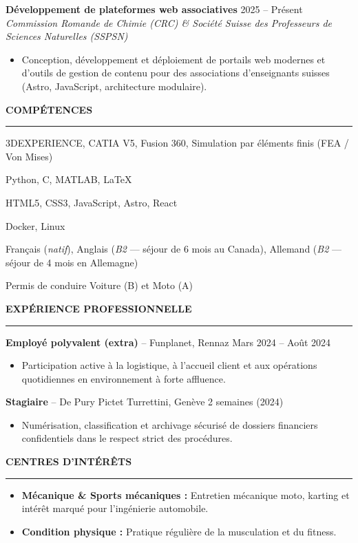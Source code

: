 \documentclass[11pt,a4paper]{article}
\newcommand{\cvsection}[1]{%
  \vspace{0.65em}%
  {\color{primary}\large\bfseries\uppercase{#1}}\\[0.1em]%
  {\color{secondary}\rule{\linewidth}{1pt}}%
  \vspace{0.25em}%
}
\begin{document}
\noindent\textbf{Développement de plateformes web associatives} \hfill {\color{textgray}\small 2025 -- Présent} \\
\textit{Commission Romande de Chimie (CRC) \& Société Suisse des Professeurs de Sciences Naturelles (SSPSN)}
\begin{itemize}
    \item Conception, développement et déploiement de portails web modernes et d'outils de gestion de contenu pour des associations d'enseignants suisses (Astro, JavaScript, architecture modulaire).
\end{itemize}

\cvsection{Compétences}

\begin{description}[leftmargin=0pt, labelindent=0pt, itemsep=0.25em]
    \item[\textcolor{primary}{CAO \& Simulation :}] 3DEXPERIENCE, CATIA V5, Fusion 360, Simulation par éléments finis (FEA / Von Mises)
    \item[\textcolor{primary}{Programmation \& Calcul :}] Python, C, MATLAB, \LaTeX
    \item[\textcolor{primary}{Développement Web :}] HTML5, CSS3, JavaScript, Astro, React
    \item[\textcolor{primary}{DevOps \& Environnement :}] Docker, Linux
    \item[\textcolor{primary}{Langues :}] Français (\textit{natif}), Anglais (\textit{B2} — séjour de 6 mois au Canada), Allemand (\textit{B2} — séjour de 4 mois en Allemagne)
    \item[\textcolor{primary}{Permis :}] Permis de conduire Voiture (B) et Moto (A)
\end{description}

\cvsection{Expérience Professionnelle}

\noindent\textbf{Employé polyvalent (extra)} – Funplanet, Rennaz \hfill {\color{textgray}\small Mars 2024 -- Août 2024}
\begin{itemize}
    \item Participation active à la logistique, à l'accueil client et aux opérations quotidiennes en environnement à forte affluence.
\end{itemize}

\noindent\textbf{Stagiaire} – De Pury Pictet Turrettini, Genève \hfill {\color{textgray}\small 2 semaines (2024)}
\begin{itemize}
    \item Numérisation, classification et archivage sécurisé de dossiers financiers confidentiels dans le respect strict des procédures.
\end{itemize}

\cvsection{Centres d'intérêts}
\begin{itemize}
    \item \textbf{Mécanique \& Sports mécaniques :} Entretien mécanique moto, karting et intérêt marqué pour l'ingénierie automobile.
    \item \textbf{Condition physique :} Pratique régulière de la musculation et du fitness.
\end{itemize}
\end{document}
